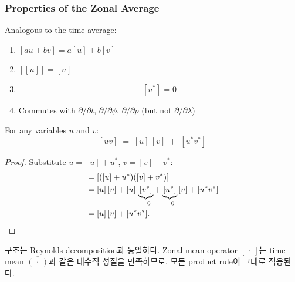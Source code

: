 \subsubsection{Properties of the Zonal Average}

\begin{proposition}\label{prop:zonal-props}

  Analogous to the time average:
  \begin{enumerate}
    \item $[au + bv] = a[u] + b[v]$ 
    \item $[[u]] = [u]$ 
    \item {}
    \begin{equation}\label{eq:eddy-mean-zero}
      [u^{*}] = 0
    \end{equation}
    \item Commutes with $\partial/\partial t$, $\partial/\partial \phi$, $\partial/\partial p$
    (but not $\partial/\partial\lambda$)
  \end{enumerate}
\end{proposition}

\begin{proposition}\label{prop:zonal-product}

  For any variables $u$ and $v$:
  \begin{equation}\label{eq:zonal-product}
    [uv] \;=\; [u]\,[v] \;+\; [u^{*}v^{*}]
  \end{equation}
\end{proposition}

\begin{proof}
  Substitute $u = [u] + u^{*}$, $v = [v] + v^{*}$:
  \begin{align*}
    [uv]
    &= [([u] + u^{*})([v] + v^{*})] \\
    &= [u]\,[v]
       + [u]\,\underbrace{[v^{*}]}_{=\,0}
       + \underbrace{[u^{*}]}_{=\,0}\,[v]
       + [u^{*}v^{*}] \\
    &= [u]\,[v] + [u^{*}v^{*}]. \qedhere
  \end{align*}
\end{proof}

\begin{remark}

  구조는 Reynolds decomposition과 동일하다. Zonal mean
  operator $[\,\cdot\,]$는 time mean $\overline{(\,\cdot\,)}$과 같은
  대수적 성질을 만족하므로, 모든 product rule이 그대로 적용된다.
\end{remark}


